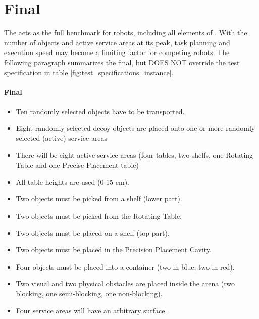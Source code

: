 
\section{Final}
\label{sec:Final}

The  acts as the full benchmark for robots, including all elements of \RCAW.
With the number of objects and active service areas at its peak, task planning and execution speed may become a limiting factor for competing robots. The following paragraph summarizes the final, but DOES NOT override the test specification in table \ref{fig:test_specifications_instance}.

\paragraph{Final}
\begin{itemize}
\item Ten randomly selected objects have to be transported.
\item Eight randomly selected decoy objects are placed onto one or more randomly selected (active) service areas
\item There will be eight active service areas (four tables,  two shelfs, one Rotating Table and one Precise Placement table)
\item All table heights are used (0-15 $\si{\centi\meter}$).
\item Two objects must be picked from a shelf (lower part).
\item Two objects must be picked from the Rotating Table.
\item Two objects must be placed on a shelf (top part).
\item Two objects must be placed in the Precision Placement Cavity.
\item Four objects must be placed into a container (two in blue, two in red).
\item Two visual and two physical obstacles are placed inside the arena (two blocking, one semi-blocking, one non-blocking).
\item Four service areas will have an arbitrary surface.
\end{itemize}